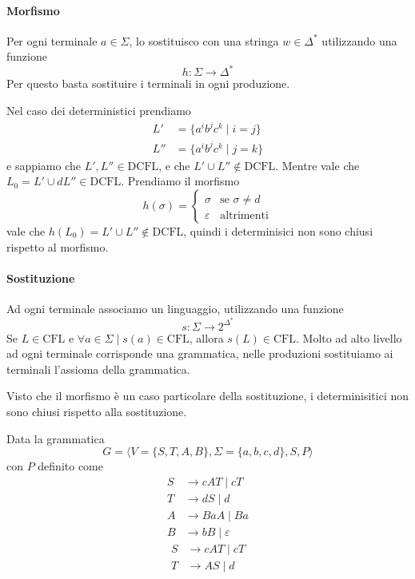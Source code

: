 \documentclass[12pt]{report}
\theoremstyle{definition}
\begin{document}
\paragraph{Morfismo} Per ogni terminale $a \in \Sigma$, lo sostituisco con una stringa $w \in \Delta^*$ utilizzando una funzione
$$ h : \Sigma \rightarrow \Delta^* $$
Per questo basta sostituire i terminali in ogni produzione.

Nel caso dei deterministici  prendiamo 
\begin{align*}
	L' &= \{ a^i b^j c^k \mid i = j \} \\
	L'' &= \{ a^i b^j c^k \mid j = k \} 
\end{align*}
e sappiamo che $L', L'' \in \text{DCFL}$, e che $L' \cup L'' \not \in \text{DCFL}$.
Mentre vale che $L_0 = L' \cup dL'' \in \text{DCFL}$.
Prendiamo il morfismo
$$ h(\sigma) = \begin{cases} \sigma & \text{se } \sigma \neq d \\ \varepsilon & \text{altrimenti} \end{cases} $$
vale che $h(L_0) = L' \cup L'' \not \in \text{DCFL}$, quindi i determinisici non sono chiusi rispetto al morfismo.

\paragraph{Sostituzione} Ad ogni terminale associamo un linguaggio, utilizzando una funzione
$$ s : \Sigma \rightarrow 2^{\Delta^*} $$
Se $L \in \text{CFL}$ e $\forall a \in \Sigma \mid s(a) \in \text{CFL}$, allora $s(L) \in \text{CFL}$.
Molto ad alto livello ad ogni terminale corrisponde una grammatica, nelle produzioni sostituiamo ai terminali l'assioma della grammatica.

Visto che il morfismo è un caso particolare della sostituzione, i determinisitici non sono chiusi rispetto alla sostituzione.


Data la grammatica
$$ G = \langle V = \{S, T, A, B\}, \Sigma = \{a, b, c, d\}, S, P \rangle $$
con $P$ definito come
\begin{align*}
		S &\rightarrow cAT \mid c T \\
		T &\rightarrow  d S \mid d \\
		A &\rightarrow B a A \mid B a \\
		B &\rightarrow b B \mid \varepsilon
\end{align*}
\begin{align*}
	S &\rightarrow c A T \mid c T \\
	T &\rightarrow A S \mid d 
\end{align*}
\end{document}
